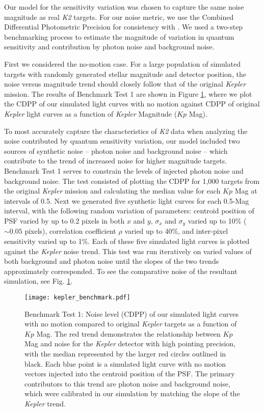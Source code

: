 \documentclass[12pt,preprint]{aastex}
\begin{document}
Our model for the sensitivity variation was chosen to capture the same noise magnitude as real \textit{K2} targets. For our noise metric, we use the Combined Differential Photometric Precision for consistency with \cite{2016AJ....152..100L}. We used a two-step benchmarking process to estimate the magnitude of variation in quantum sensitivity and contribution by photon noise and background noise.

First we considered the no-motion case. For a large population of simulated targets with randomly generated stellar magnitude and detector position, the noise versus magnitude trend should closely follow that of the original \textit{Kepler} mission. The results of  Benchmark Test 1 are shown in Figure \ref{fig:nomotion}, where we plot the CDPP of our simulated light curves with no motion against CDPP of original \textit{Kepler} light curves as a function of \textit{Kepler} Magnitude ($Kp$ Mag).

To most accurately capture the characteristics of \textit{K2} data when analyzing the noise contributed by quantum sensitivity variation, our model included two sources of synthetic noise -- photon noise and background noise -- which contribute to the trend of increased noise for higher magnitude targets. Benchmark Test 1 serves to constrain the levels of injected photon noise and background noise. The test consisted of plotting the CDPP for 1,000 targets from the original \textit{Kepler} mission and calculating the median value for each $Kp$ Mag at intervals of 0.5. Next we generated five synthetic light curves for each 0.5-Mag interval, with the following random variation of parameters: centroid position of PSF varied by up to 0.2 pixels in both $x$ and $y$, $\sigma_x$ and $\sigma_y$ varied up to 10\% (${\sim}0.05$ pixels), correlation coefficient $\rho$ varied up to 40\%, and inter-pixel sensitivity varied up to 1\%. Each of these five simulated light curves is plotted against the \textit{Kepler} noise trend. This test was run iteratively on varied values of both background and photon noise until the slopes of the two trends approximately corresponded. To see the comparative noise of the resultant simulation, see Fig. \ref{fig:nomotion}.

\begin{figure}[h]
	\centering
	\texttt{[image: kepler\_benchmark.pdf]}
	\caption{Benchmark Test 1: Noise level (CDPP) of our simulated light curves with no motion compared to original \textit{Kepler} targets as a function of $Kp$ Mag. The red trend demonstrates the relationship between $Kp$ Mag and noise for the \textit{Kepler} detector with high pointing precision, with the median represented by the larger red circles outlined in black. Each blue point is a simulated light curve with no motion vectors injected into the centroid position of the PSF. The primary contributors to this trend are photon noise and background noise, which were calibrated in our simulation by matching the slope of the \textit{Kepler} trend.}
	\label{fig:nomotion}
\end{figure}
\end{document}
